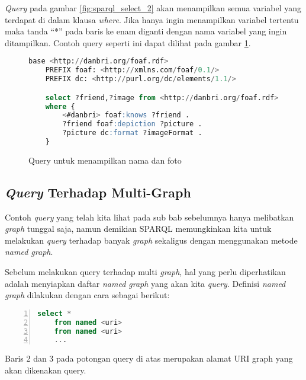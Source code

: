 \emph{Query} pada gambar \ref{fig:sparql_select_2} akan menampilkan semua variabel yang terdapat di dalam klausa \emph{where}. Jika hanya ingin menampilkan variabel tertentu maka tanda ``*'' pada baris ke enam diganti dengan nama variabel yang ingin ditampilkan. Contoh query seperti ini dapat dilihat pada gambar \ref{fig:sparql_select_3}.

\begin{figure}[hb]
	\centering
	\begin{lstlisting}[language=SQL]
	base <http://danbri.org/foaf.rdf>
	PREFIX foaf: <http://xmlns.com/foaf/0.1/>
	PREFIX dc: <http://purl.org/dc/elements/1.1/>

	select ?friend,?image from <http://danbri.org/foaf.rdf>
	where {
		<#danbri> foaf:knows ?friend .
		?friend foaf:depiction ?picture .
		?picture dc:format ?imageFormat .
	}
	\end{lstlisting}
	\caption{Query untuk menampilkan nama dan foto}
	\label{fig:sparql_select_3}
\end{figure}

\subsection{\emph{Query} Terhadap Multi-Graph}
Contoh \emph{query} yang telah kita lihat pada sub bab sebelumnya hanya melibatkan \emph{graph} tunggal saja, namun demikian SPARQL memungkinkan kita untuk melakukan \emph{query} terhadap banyak \emph{graph} sekaligus dengan menggunakan metode \emph{named graph}.

Sebelum melakukan query terhadap multi \emph{graph}, hal yang perlu diperhatikan adalah menyiapkan daftar \emph{named graph} yang akan kita \emph{query}. Definisi \emph{named graph} dilakukan dengan cara sebagai berikut:

\begin{lstlisting}[language=SQL, xleftmargin=15pt, numbers=left]
	select *
	from named <uri>
	from named <uri>
	...
\end{lstlisting}

Baris 2 dan 3 pada potongan query di atas merupakan alamat URI graph yang akan dikenakan query.